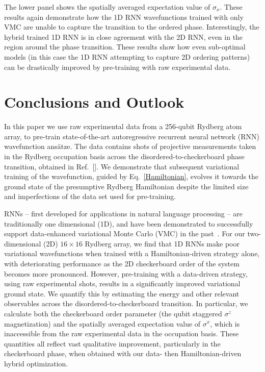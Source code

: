 \documentclass[twocolumn,
                showpacs,
                nofootinbib,
                nobibnotes,
                aps,
                superscriptaddress,
                amssymb,
                amsmath,
                floatfix,
                reprint,
                prx, 
                notitlepage,
                showkeys,
                10pt,
		]{revtex4-2}
\begin{document}
The lower panel shows the spatially averaged expectation value of $\hat\sigma_x$. 
These results again demonstrate how the 1D RNN wavefunctions trained with only VMC are unable to capture the transition to the ordered phase. Interestingly, the hybrid trained 1D RNN is in close agreement with the 2D RNN, even in the region around the phase transition.
These results show how even sub-optimal models (in this case the 1D RNN attempting to capture 2D ordering patterns) can be drastically improved by pre-training with raw experimental data.

%
\section{Conclusions and Outlook}
%


In this paper we use raw experimental data from a 256-qubit 
Rydberg atom array, to pre-train state-of-the-art autoregressive recurrent neural network (RNN) wavefunction ans\"atze. 
The data contains shots of projective measurements taken in the Rydberg occupation basis across the disordered-to-checkerboard phase transition, obtained in Ref.~[].
We demonstrate that subsequent variational training of the wavefunction, guided by Eq.~\eqref{Hamiltonian}, evolves it towards the ground state of the presumptive Rydberg Hamiltonian despite the limited size and imperfections of the data set used for pre-training.  


RNNs -- first developed for applications in natural language processing -- are traditionally one dimensional (1D), and have been demonstrated to successfully support data-enhanced variational Monte Carlo (VMC) in the past~\cite{hibat2020recurrent,czischek2022data}.  For our two-dimensional (2D) $16 \times 16$ Rydberg array, we find that 1D RNNs make poor variational wavefunctions when trained with a Hamiltonian-driven strategy alone, with deteriorating performance as the 2D checkerboard order of the system becomes more pronounced. However, pre-training with a data-driven strategy, using raw experimental shots, results in a significantly improved variational ground state.
We quantify this by estimating the energy and other relevant observables across the disordered-to-checkerboard transition.
In particular, we calculate both the checkerboard order parameter (the qubit staggered $\sigma^z$ magnetization) and the spatially averaged expectation value of $\sigma^x$, which is inaccessible from the raw experimental data in the occupation basis. These quantities all reflect vast qualitative improvement, particularly in the checkerboard phase, when obtained with our data- then Hamiltonian-driven hybrid optimization.
\end{document}
